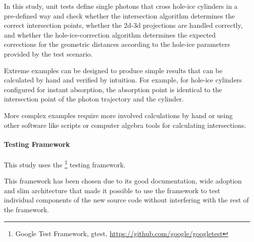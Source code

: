 In this study, unit tests define single photons that cross hole-ice cylinders in a pre-defined way and check whether the intersection algorithm determines the correct intersection points, whether the 2d-3d projections are handled correctly, and whether the hole-ice-correction algorithm determines the expected corrections for the geometric distances according to the hole-ice parameters provided by the test scenario.

Extreme examples can be designed to produce simple results that can be calculated by hand and verified by intuition. For example, for hole-ice cylinders configured for instant absorption, the absorption point is identical to the intersection point of the photon trajectory and the cylinder.

More complex examples require more involved calculations by hand or using other software like  scripts or computer algebra tools for calculating intersections.



\paragraph{Testing Framework}
This study uses the \footnote{Google Test Framework, gtest, \url{https://github.com/google/googletest}} testing framework.

This framework has been chosen due to its good documentation, wide adoption and slim architecture that made it possible to use the framework to test individual components of the new source code without interfering with the rest of the \icesim framework.


